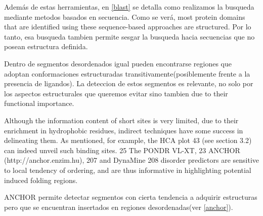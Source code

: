 Además de estas herramientas, en \ref{blast} se detalla como realizamos la busqueda mediante metodos basados en secuencia. 
Como se verá, most protein domains that are identified using these sequence-based approaches are structured.
Por lo tanto, esa busqueda tambien permite sesgar la busqueda hacia secuencias que no posean estructura definida.








Dentro de segmentos desordenados igual pueden encontrarse regiones que adoptan conformaciones estructuradas transitivamente(posiblemente frente a la presencia de ligandos).
La deteccion de estos segmentos es relevante, no solo por los aspectos estructurales que queremos evitar %
sino tambien due to their functional importance. %

Although the information content of short sites is very limited, due to their enrichment in hydrophobic residues, indirect techniques have
some success in delineating them. As mentioned, for example, the HCA plot 43 (see section 3.2) can indeed unveil such binding
sites. 25 The PONDR VL-XT, 23 ANCHOR (http://anchor.enzim.hu), 207 and DynaMine 208 disorder predictors are sensitive
to local tendency of ordering, and are thus informative in highlighting potential induced folding regions.



ANCHOR permite detectar segmentos con cierta tendencia a adquirir estructuras pero que se encuentran insertados en regiones desordenadas(ver \ref{anchor}).








